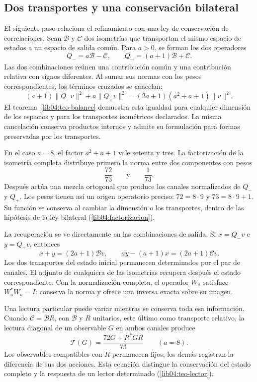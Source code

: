 \subsection*{Dos transportes y una conservación bilateral}
\label{libnar:bilateral}

El siguiente paso relaciona el refinamiento con una ley de
conservación de correlaciones. Sean \(\mathcal B\) y
\(\mathcal C\) dos isometrías que transportan el mismo espacio de
estados a un espacio de salida común. Para \(a>0\), se forman los
dos operadores
\[
 Q_-=a\mathcal B-\mathcal C,\qquad
 Q_+=(a+1)\mathcal B+\mathcal C.
\]
Las dos combinaciones reúnen una contribución común y una
contribución relativa con signos diferentes. Al sumar sus normas
con los pesos correspondientes, los términos cruzados se cancelan:
\[
 (a+1)\|Q_-v\|^2+a\|Q_+v\|^2
   =(2a+1)(a^2+a+1)\|v\|^2.
\]
El teorema~\ref{lib04:teo-balance} demuestra esta igualdad para cualquier
dimensión de los espacios y para los transportes isométricos
declarados. La misma cancelación conserva productos internos y
admite su formulación para formas preservadas por los transportes.

En el caso \(a=8\), el factor \(a^2+a+1\) vale setenta y tres.
La factorización de la isometría completa distribuye primero la
norma entre dos componentes con pesos
\[
 \frac{72}{73}\qquad\text{y}\qquad\frac{1}{73}.
\]
Después actúa una mezcla ortogonal que produce los canales
normalizados de \(Q_-\) y \(Q_+\). Los pesos tienen así un
origen operatorio preciso: \(72=8\cdot9\) y
\(73=8\cdot9+1\). Su función se conserva al cambiar la dimensión
o los transportes, dentro de las hipótesis de la ley bilateral
(\cref{lib04:factorizacion}).

La recuperación se ve directamente en las combinaciones de salida.
Si \(x=Q_-v\) e \(y=Q_+v\), entonces
\[
 x+y=(2a+1)\mathcal Bv,\qquad
 ay-(a+1)x=(2a+1)\mathcal Cv.
\]
Los dos transportes del estado inicial permanecen determinados por
el par de canales. El adjunto de cualquiera de las isometrías
recupera después el estado correspondiente. Con la normalización
completa, el operador \(W_a\) satisface \(W_a^*W_a=I\):
conserva la norma y ofrece una inversa exacta sobre su imagen.

Una lectura particular puede variar mientras se conserva toda esa
información. Cuando \(\mathcal C=\mathcal B R\), con
\(\mathcal B\) y \(R\) unitarios, este último como transporte relativo, la
lectura diagonal de un observable \(G\) en ambos canales produce
\[
 \mathcal T(G)=\frac{72G+R^*GR}{73}
 \qquad(a=8).
\]
Los observables compatibles con \(R\) permanecen fijos; los demás
registran la diferencia de sus dos acciones. Esta ecuación distingue
la conservación del estado completo y la respuesta de un lector
determinado (\cref{lib04:teo-lector}).

